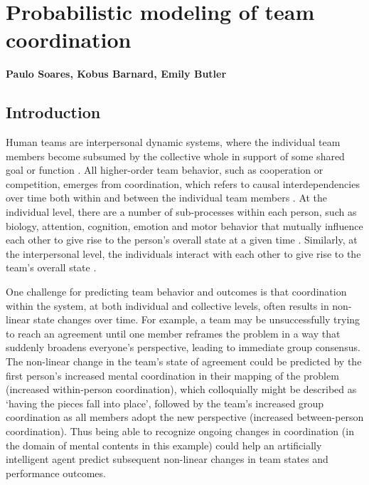 \chapter{Probabilistic modeling of team coordination}
\label{ch:pgm}
\textbf{Paulo Soares, Kobus Barnard, Emily Butler}

\section{Introduction} Human teams are interpersonal dynamic systems, where the
individual team members become subsumed by the collective whole in support of
some shared goal or function \citep{nowak2020insync, Cooke.ea:2013,
eiler2017interaction, fusaroli2014dialog, gorman2010team, wiltshire2017problem,
wiltshire2019multiscale}.  All higher-order team behavior, such as cooperation
or competition, emerges from coordination, which refers to causal
interdependencies over time both within and between the individual team members
\citep{butner2014modeling}. At the individual level, there are a number of
sub-processes within each person, such as biology, attention, cognition,
emotion and motor behavior that mutually influence each other to give rise to
the person’s overall state at a given time
\citep{butler2011temporal,butler2017emotions}. Similarly, at the interpersonal
level, the individuals interact with each other to give rise to the team’s
overall state \citep{nowak2020insync, butler2011temporal, butler2017emotions,
gorman2010team, letsky2008macrocognition}.

One challenge for predicting team behavior and outcomes is that coordination
within the system, at both individual and collective levels, often results in
non-linear state changes over time. For example, a team may be unsuccessfully
trying to reach an agreement until one member reframes the problem in a way that
suddenly broadens everyone’s perspective, leading to immediate group consensus.
The non-linear change in the team’s state of agreement could be predicted by the
first person’s increased mental coordination in their mapping of the problem
(increased within-person coordination), which colloquially might be described as
`having the pieces fall into place', followed by the team’s increased group
coordination as all members adopt the new perspective (increased between-person
coordination). Thus being able to recognize ongoing changes in coordination (in
the domain of mental contents in this example) could help an artificially
intelligent agent predict subsequent non-linear changes in team states and
performance outcomes. 

